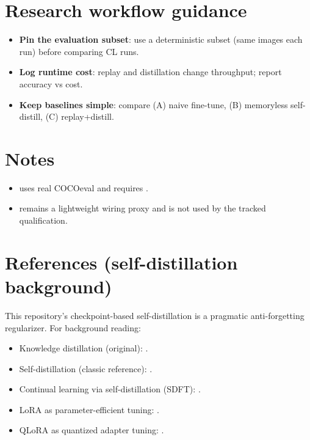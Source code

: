 \section{Research workflow guidance}
\begin{itemize}
  \item \textbf{Pin the evaluation subset}: use a deterministic subset (same images each run) before comparing CL runs.
  \item \textbf{Log runtime cost}: replay and distillation change throughput; report accuracy vs cost.
  \item \textbf{Keep baselines simple}: compare (A) naive fine-tune, (B) memoryless self-distill, (C) replay+distill.
\end{itemize}

\section{Notes}
\begin{itemize}
  \item {} uses real COCOeval and requires
    .
  \item {} remains a lightweight wiring proxy and is not used by
    the tracked qualification.
\end{itemize}

\section{References (self-distillation background)}
This repository's checkpoint-based self-distillation is a pragmatic anti-forgetting regularizer.
For background reading:
\begin{itemize}
  \item Knowledge distillation (original): \cite{hinton2015distilling}.
  \item Self-distillation (classic reference): \cite{furlanello2018bornagain}.
  \item Continual learning via self-distillation (SDFT): \cite{shenfeld2026sdft}.
  \item LoRA as parameter-efficient tuning: \cite{hu2021lora}.
  \item QLoRA as quantized adapter tuning: \cite{dettmers2023qlora}.
\end{itemize}
